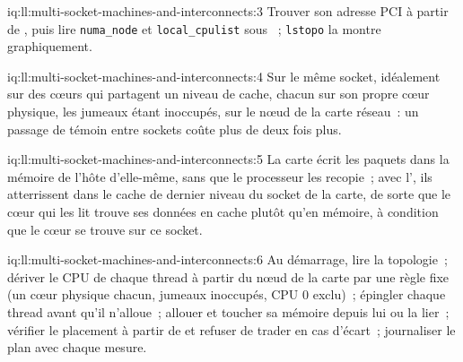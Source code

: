 \begin{solution}{iq:ll:multi-socket-machines-and-interconnects:3} \sloppy
Trouver son adresse PCI à partir de , puis lire \texttt{numa\_node} et \texttt{local\_cpulist}
sous ~; \texttt{lstopo} la montre graphiquement.
\end{solution}

\begin{solution}{iq:ll:multi-socket-machines-and-interconnects:4}
Sur le même socket, idéalement sur des cœurs qui partagent un niveau de cache, chacun sur son propre cœur physique, les jumeaux étant inoccupés, sur le
nœud de la carte réseau~: un passage de témoin entre sockets coûte plus de deux fois plus.
\end{solution}

\begin{solution}{iq:ll:multi-socket-machines-and-interconnects:5}
La carte écrit les paquets dans la mémoire de l'hôte d'elle-même, sans que le processeur les recopie~; avec l', ils
atterrissent dans le cache de dernier niveau du socket de la carte, de sorte que le cœur qui les lit trouve ses données en cache plutôt qu'en mémoire, à condition que
le cœur se trouve sur ce socket.
\end{solution}

\begin{solution}{iq:ll:multi-socket-machines-and-interconnects:6}
Au démarrage, lire la topologie~; dériver le CPU de chaque thread à partir du nœud de la carte par une règle fixe (un cœur physique chacun,
jumeaux inoccupés, CPU 0 exclu)~; épingler chaque thread avant qu'il n'alloue~; allouer et toucher sa mémoire depuis lui ou la lier~;
vérifier le placement à partir de  et refuser de trader en cas d'écart~; journaliser le plan avec chaque mesure.
\end{solution}
